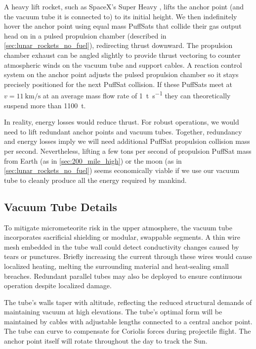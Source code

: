 \documentclass{article}
\begin{document}
A heavy lift rocket, such as SpaceX's Super Heavy \cite{spacex_super_heavy}, lifts the anchor point (and the vacuum tube it is connected to) to its initial height.  We then indefinitely hover the anchor point using equal mass PuffSats that collide their gas output head on in a pulsed propulsion chamber (described in \autoref{sec:lunar_rockets_no_fuel}), redirecting thrust downward. The propulsion chamber exhaust can be angled slightly to provide thrust vectoring to counter atmospheric winds on the vacuum tube and support cables.  A reaction control system on the anchor point adjusts the pulsed propulsion chamber so it stays precisely positioned for the next PuffSat collision.  If these PuffSats meet at $v=\SI{11}{\kilo\meter\per\second}$ at an average mass flow rate of \SI{1}{\tonne\per\second} they can theoretically suspend more than \SI{1100}{\tonne}.   

In reality, energy losses would reduce thrust.   For robust operations, we would need to lift redundant anchor points and vacuum tubes.  Together, redundancy and energy losses imply we will need additional PuffSat propulsion collision mass per second.  Nevertheless, lifting a few tons per second of propulsion PuffSat mass from Earth (as in \autoref{sec:200_mile_high}) or the moon (as in \autoref{sec:lunar_rockets_no_fuel}) seems economically viable if we use our vacuum tube to cleanly produce all the energy required by mankind. 

\subsection{Vacuum Tube Details}
To mitigate micrometeorite risk in the upper atmosphere, the vacuum tube incorporates sacrificial shielding or modular, swappable segments. A thin wire mesh embedded in the tube wall could detect conductivity changes caused by tears or punctures. Briefly increasing the current through these wires would cause localized heating, melting the surrounding material and heat-sealing small breaches. Redundant parallel tubes may also be deployed to ensure continuous operation despite localized damage. 

The tube’s walls taper with altitude, reflecting the reduced structural demands of maintaining vacuum at high elevations.  The tube's optimal form will be maintained by cables with adjustable lengths connected to a central anchor point. The tube can curve to compensate for Coriolis forces during projectile flight. The anchor point itself will rotate throughout the day to track the Sun.
\end{document}
